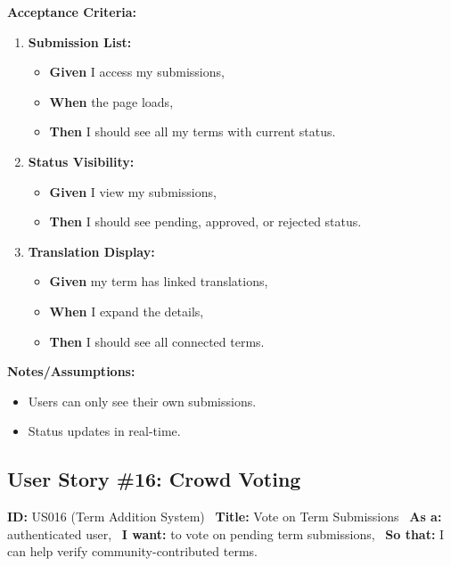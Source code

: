 \documentclass[12pt]{article}
\begin{document}
\vspace{1em}
\textbf{Acceptance Criteria:}
\begin{enumerate}
\item \textbf{Submission List:}
\begin{itemize}
\item \textbf{Given} I access my submissions,
\item \textbf{When} the page loads,
\item \textbf{Then} I should see all my terms with current status.
\end{itemize}

\item \textbf{Status Visibility:}
\begin{itemize}
    \item \textbf{Given} I view my submissions,
    \item \textbf{Then} I should see pending, approved, or rejected status.
\end{itemize}

\item \textbf{Translation Display:}
\begin{itemize}
    \item \textbf{Given} my term has linked translations,
    \item \textbf{When} I expand the details,
    \item \textbf{Then} I should see all connected terms.
\end{itemize}
\end{enumerate}

\vspace{1em}
\textbf{Notes/Assumptions:}
\begin{itemize}
\item Users can only see their own submissions.
\item Status updates in real-time.
\end{itemize}

\subsection{User Story \#16: Crowd Voting}
\textbf{ID:} US016 (Term Addition System) \
\textbf{Title:} Vote on Term Submissions \
\textbf{As a:} authenticated user, \
\textbf{I want:} to vote on pending term submissions, \
\textbf{So that:} I can help verify community-contributed terms.
\end{document}
